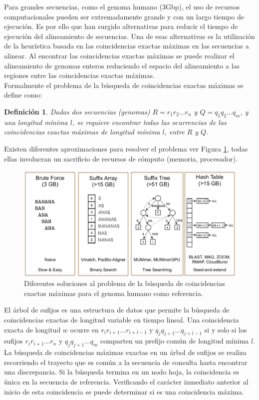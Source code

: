 \documentclass[12pt,a4paper]{article}
\newtheorem{mydef}{Definición}
\begin{document}
\indent
Para grandes secuencias, como el genoma humano (3Gbp), el uso de recursos computacionales pueden ser extremadamente grande y con un largo tiempo de ejecución. Es por ello que han surgido alternativas para reducir el tiempo de ejecución del alineamiento de secuencias. Una de esas alternativas es la utilización de la heurística basada en las coincidencias exactas máximas en las secuencias a alinear. Al encontrar las coincidencias exactas máximas se puede realizar el alineamiento de genomas enteros reduciendo el espacio del alineamiento a las regiones entre las coincidencias exactas máximas.\\
\indent
Formalmente el problema de la búsqueda de coincidencias exactas máximas se define como:
\begin{mydef}
  Dadas dos secuencias (genomas) $R=r_{1}r_{2}\hdots r_{n}$ y $Q=q_{1}q_{2}\hdots q_{m}$, y una longitud mínima $l$, se requiere encontrar todas las ocurrencias de las coincidencias exactas máximas de longitud mínima $l$, entre $R$ y $Q$.
\end{mydef}
Existen diferentes aproximaciones para resolver el problema ver Figura \ref{fig:state}, todas ellas involucran un sacrificio de recursos de cómputo (memoria, procesador).
\begin{figure}[h] 
   \centering 
   \includegraphics[scale=0.3]{state.png} 
   \caption{Diferentes soluciones al problema de la búsqueda de coincidencias exactas máximas para el genoma humano como referencia.} 
   \label{fig:state} 
 \end{figure}
\indent
El árbol de sufijos es una estructura de datos que permite la b\'usqueda de 
coincidencias exactas de longitud variable en tiempo lineal. Una coincidencia exacta de longitud $w$ ocurre en $r_{i}r_{i+1}\hdots r_{i+l-1}$ y $q_{j}q_{j+1}\hdots q_{j+l-1}$ si y solo si los sufijos $r_{i}r_{i+1}\hdots r_{n}$ y $q_{j}q_{j+1}\hdots q_{m}$ comparten un prefijo común de longitud mínima $l$. La búsqueda de coincidencias máximas exactas en un árbol de sufijos se realiza recorriendo el trayecto que es común a la secuencia de consulta hasta encontrar una discrepancia. Si la búsqueda termina en un nodo hoja, la coincidencia es única en la secuencia de referencia. Verificando el carácter inmediato anterior al inicio de esta coincidencia se puede determinar si es una coincidencia  máxima.\\
\end{document}

